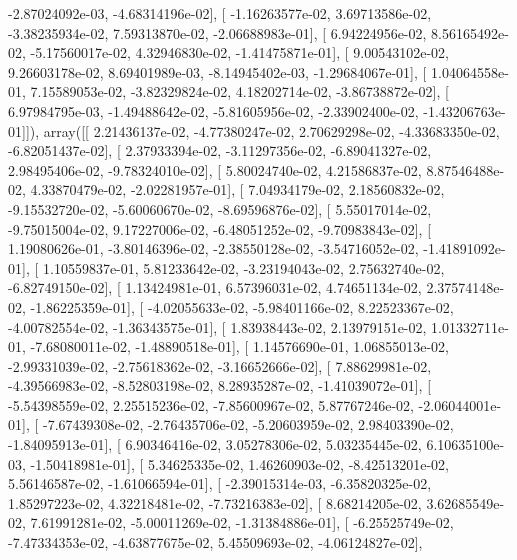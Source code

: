 \documentclass{article}
\begin{document}
         -2.87024092e-03,  -4.68314196e-02],
       [ -1.16263577e-02,   3.69713586e-02,  -3.38235934e-02,
          7.59313870e-02,  -2.06688983e-01],
       [  6.94224956e-02,   8.56165492e-02,  -5.17560017e-02,
          4.32946830e-02,  -1.41475871e-01],
       [  9.00543102e-02,   9.26603178e-02,   8.69401989e-03,
         -8.14945402e-03,  -1.29684067e-01],
       [  1.04064558e-01,   7.15589053e-02,  -3.82329824e-02,
          4.18202714e-02,  -3.86738872e-02],
       [  6.97984795e-03,  -1.49488642e-02,  -5.81605956e-02,
         -2.33902400e-02,  -1.43206763e-01]]), array([[  2.21436137e-02,  -4.77380247e-02,   2.70629298e-02,
         -4.33683350e-02,  -6.82051437e-02],
       [  2.37933394e-02,  -3.11297356e-02,  -6.89041327e-02,
          2.98495406e-02,  -9.78324010e-02],
       [  5.80024740e-02,   4.21586837e-02,   8.87546488e-02,
          4.33870479e-02,  -2.02281957e-01],
       [  7.04934179e-02,   2.18560832e-02,  -9.15532720e-02,
         -5.60060670e-02,  -8.69596876e-02],
       [  5.55017014e-02,  -9.75015004e-02,   9.17227006e-02,
         -6.48051252e-02,  -9.70983843e-02],
       [  1.19080626e-01,  -3.80146396e-02,  -2.38550128e-02,
         -3.54716052e-02,  -1.41891092e-01],
       [  1.10559837e-01,   5.81233642e-02,  -3.23194043e-02,
          2.75632740e-02,  -6.82749150e-02],
       [  1.13424981e-01,   6.57396031e-02,   4.74651134e-02,
          2.37574148e-02,  -1.86225359e-01],
       [ -4.02055633e-02,  -5.98401166e-02,   8.22523367e-02,
         -4.00782554e-02,  -1.36343575e-01],
       [  1.83938443e-02,   2.13979151e-02,   1.01332711e-01,
         -7.68080011e-02,  -1.48890518e-01],
       [  1.14576690e-01,   1.06855013e-02,  -2.99331039e-02,
         -2.75618362e-02,  -3.16652666e-02],
       [  7.88629981e-02,  -4.39566983e-02,  -8.52803198e-02,
          8.28935287e-02,  -1.41039072e-01],
       [ -5.54398559e-02,   2.25515236e-02,  -7.85600967e-02,
          5.87767246e-02,  -2.06044001e-01],
       [ -7.67439308e-02,  -2.76435706e-02,  -5.20603959e-02,
          2.98403390e-02,  -1.84095913e-01],
       [  6.90346416e-02,   3.05278306e-02,   5.03235445e-02,
          6.10635100e-03,  -1.50418981e-01],
       [  5.34625335e-02,   1.46260903e-02,  -8.42513201e-02,
          5.56146587e-02,  -1.61066594e-01],
       [ -2.39015314e-03,  -6.35820325e-02,   1.85297223e-02,
          4.32218481e-02,  -7.73216383e-02],
       [  8.68214205e-02,   3.62685549e-02,   7.61991281e-02,
         -5.00011269e-02,  -1.31384886e-01],
       [ -6.25525749e-02,  -7.47334353e-02,  -4.63877675e-02,
          5.45509693e-02,  -4.06124827e-02],
\end{document}
